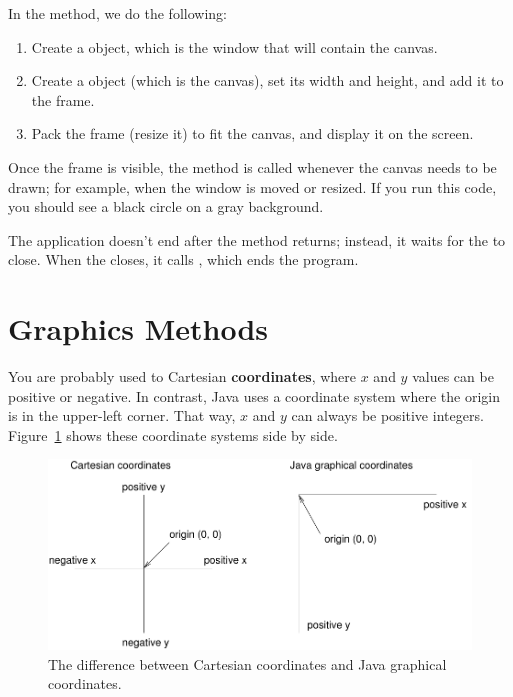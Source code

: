 
In the  method, we do the following:

\begin{enumerate}

\item Create a  object, which is the window that will contain the canvas.

\item Create a  object (which is the canvas), set its width and height, and add it to the frame.

\item Pack the frame (resize it) to fit the canvas, and display it on the screen.
\end{enumerate}


Once the frame is visible, the  method is called whenever the canvas needs to be drawn; for example, when the window is moved or resized.
If you run this code, you should see a black circle on a gray background.

The application doesn't end after the  method returns; instead, it waits for the  to close.
When the  closes, it calls , which ends the program.

\section{Graphics Methods}


You are probably used to Cartesian {\bf coordinates}, where $x$ and $y$ values can be positive or negative.
In contrast, Java uses a coordinate system where the origin is in the upper-left corner.
That way, $x$ and $y$ can always be positive integers.
Figure~\ref{fig.coordinates} shows these coordinate systems side by side.

\begin{figure}[!ht]
\begin{center}
\includegraphics[width=5in]{figs/coordinates.pdf}
\caption{The difference between Cartesian coordinates and Java graphical coordinates.}
\label{fig.coordinates}
\end{center}
\end{figure}

